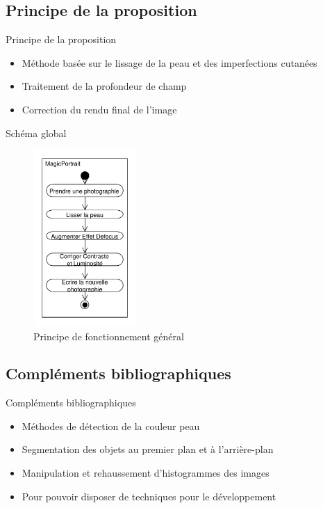 \documentclass{beamer}
\begin{document}
\subsection{Principe de la proposition}

\begin{frame}{Principe de la proposition}
\begin{itemize}
\item Méthode basée sur le lissage de la peau et des imperfections cutanées
\item Traitement de la profondeur de champ
\item Correction du rendu final de l'image
\end{itemize}
\end{frame}

\begin{frame}{Schéma global}
\begin{figure}
\centering
\includegraphics[width=0.35\textwidth]{DiagrammeActivites_00_Global}
\caption{Principe de fonctionnement général}
\end{figure}
\end{frame}

\subsection{Compléments bibliographiques}

\begin{frame}{Compléments bibliographiques}
\begin{itemize}
\item Méthodes de détection de la couleur peau
\item Segmentation des objets au premier plan et à l'arrière-plan
\item Manipulation et rehaussement d'histogrammes des images
\item Pour pouvoir disposer de techniques pour le développement
\end{itemize}
\end{frame}
\end{document}
